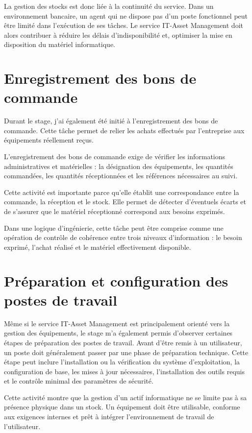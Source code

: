 \documentclass[12pt,a4paper]{report}
\begin{document}
La gestion des stocks est donc liée à la continuité du service. Dans un environnement bancaire, un agent qui ne dispose pas d'un poste fonctionnel peut être limité dans l'exécution de ses tâches. Le service IT-Asset Management doit alors contribuer à réduire les délais d'indisponibilité et, optimiser la mise en disposition du matériel informatique.

\section{Enregistrement des bons de commande}

Durant le stage, j'ai également été initié à l'enregistrement des bons de commande. Cette tâche permet de relier les achats effectués par l'entreprise aux équipements réellement reçus.

L'enregistrement des bons de commande exige de vérifier les informations administratives et matérielles : la désignation des équipements, les quantités commandées, les quantités réceptionnées et les références nécessaires au suivi.

Cette activité est importante parce qu'elle établit une correspondance entre la commande, la réception et le stock. Elle permet de détecter d'éventuels écarts et de s'assurer que le matériel réceptionné correspond aux besoins exprimés.

Dans une logique d'ingénierie, cette tâche peut être comprise comme une opération de contrôle de cohérence entre trois niveaux d'information : le besoin exprimé, l'achat réalisé et le matériel effectivement disponible.

\section{Préparation et configuration des postes de travail}

Même si le service IT-Asset Management est principalement orienté vers la gestion des équipements, le stage m'a également permis d'observer certaines étapes de préparation des postes de travail.
Avant d'être remis à un utilisateur, un poste doit généralement passer par une phase de préparation technique. Cette étape peut inclure l'installation ou la vérification du système d'exploitation, la configuration de base, les mises à jour nécessaires, l'installation des outils requis et le contrôle minimal des paramètres de sécurité.

Cette activité montre que la gestion d'un actif informatique ne se limite pas à sa présence physique dans un stock. Un équipement doit être utilisable, conforme aux exigences internes et prêt à intégrer l'environnement de travail de l'utilisateur.
\end{document}
